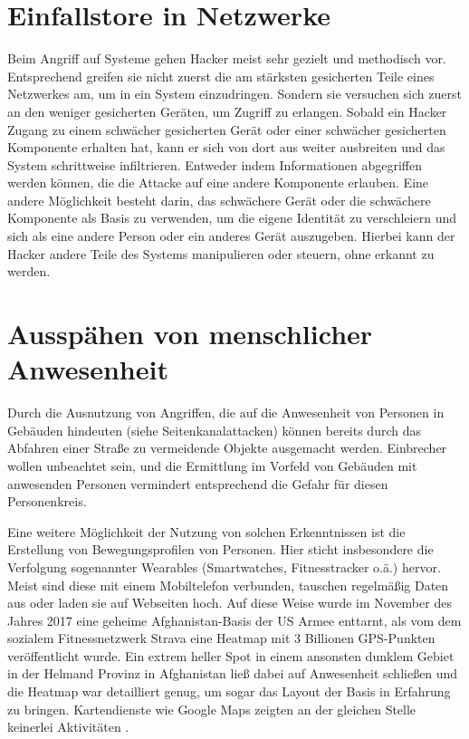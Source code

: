 \documentclass[12pt, a4paper, onecolumn, oneside, toc=bibliographynumbered, liststotoc]{scrreprt} %
\begin{document}
		\section{Einfallstore in Netzwerke}
  Beim Angriff auf Systeme gehen Hacker meist sehr gezielt und methodisch vor. Entsprechend greifen sie nicht zuerst die am stärksten gesicherten Teile eines Netzwerkes am, um in ein System einzudringen. Sondern sie versuchen sich zuerst an den weniger gesicherten Geräten, um Zugriff zu erlangen. Sobald ein Hacker Zugang zu einem schwächer gesicherten Gerät oder einer schwächer gesicherten Komponente erhalten hat, kann er sich von dort aus weiter ausbreiten und das System schrittweise infiltrieren. Entweder indem Informationen abgegriffen werden können, die die Attacke auf eine andere Komponente erlauben. Eine andere Möglichkeit besteht darin, das schwächere Gerät oder die schwächere Komponente als Basis zu verwenden, um die eigene Identität zu verschleiern und sich als eine andere Person oder ein anderes Gerät auszugeben. Hierbei kann der Hacker andere Teile des Systems manipulieren oder steuern, ohne erkannt zu werden.
  
		\section{Ausspähen von menschlicher Anwesenheit}
  Durch die Ausnutzung von Angriffen, die auf die Anwesenheit von Personen in Gebäuden hindeuten (siehe Seitenkanalattacken) können bereits durch das Abfahren einer Straße zu vermeidende Objekte ausgemacht werden. Einbrecher wollen unbeachtet sein, und die Ermittlung im Vorfeld von Gebäuden mit anwesenden Personen vermindert entsprechend die Gefahr für diesen Personenkreis.
  
  Eine weitere Möglichkeit der Nutzung von solchen Erkenntnissen ist die Erstellung von Bewegungsprofilen von Personen. Hier sticht insbesondere die Verfolgung sogenannter Wearables (Smartwatches, Fitnesstracker o.ä.) hervor. Meist sind diese mit einem Mobiltelefon verbunden, tauschen regelmäßig Daten aus oder laden sie auf Webseiten hoch. Auf diese Weise wurde im November des Jahres 2017 eine geheime Afghanistan-Basis der US Armee enttarnt, als vom dem sozialem Fitnessnetzwerk Strava eine Heatmap mit 3 Billionen GPS-Punkten veröffentlicht wurde. Ein extrem heller Spot in einem ansonsten dunklem Gebiet in der Helmand Provinz in Afghanistan ließ dabei auf Anwesenheit schließen und die Heatmap war detailliert genug, um sogar das Layout der Basis in Erfahrung zu bringen. Kartendienste wie Google Maps zeigten an der gleichen Stelle keinerlei Aktivitäten \parencite{.20180128}. 
\end{document}
